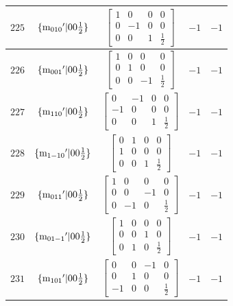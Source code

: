 \documentclass[fleqn,8pt]{jsarticle}
\begin{document}
\begin{longtable}{ccccc}
$ 225 $ & $ \{{\rm m}_{010}{}'|0 0 \frac{1}{2}\} $ & $ \begin{bmatrix} 1 & 0 & 0 & 0 \\ 0 & -1 & 0 & 0 \\ 0 & 0 & 1 & \frac{1}{2} \end{bmatrix} $ & $ -1 $ & $ -1 $ \\ \hline
$ 226 $ & $ \{{\rm m}_{001}{}'|0 0 \frac{1}{2}\} $ & $ \begin{bmatrix} 1 & 0 & 0 & 0 \\ 0 & 1 & 0 & 0 \\ 0 & 0 & -1 & \frac{1}{2} \end{bmatrix} $ & $ -1 $ & $ -1 $ \\ \hline
$ 227 $ & $ \{{\rm m}_{110}{}'|0 0 \frac{1}{2}\} $ & $ \begin{bmatrix} 0 & -1 & 0 & 0 \\ -1 & 0 & 0 & 0 \\ 0 & 0 & 1 & \frac{1}{2} \end{bmatrix} $ & $ -1 $ & $ -1 $ \\ \hline
$ 228 $ & $ \{{\rm m}_{1-10}{}'|0 0 \frac{1}{2}\} $ & $ \begin{bmatrix} 0 & 1 & 0 & 0 \\ 1 & 0 & 0 & 0 \\ 0 & 0 & 1 & \frac{1}{2} \end{bmatrix} $ & $ -1 $ & $ -1 $ \\ \hline
$ 229 $ & $ \{{\rm m}_{011}{}'|0 0 \frac{1}{2}\} $ & $ \begin{bmatrix} 1 & 0 & 0 & 0 \\ 0 & 0 & -1 & 0 \\ 0 & -1 & 0 & \frac{1}{2} \end{bmatrix} $ & $ -1 $ & $ -1 $ \\ \hline
$ 230 $ & $ \{{\rm m}_{01-1}{}'|0 0 \frac{1}{2}\} $ & $ \begin{bmatrix} 1 & 0 & 0 & 0 \\ 0 & 0 & 1 & 0 \\ 0 & 1 & 0 & \frac{1}{2} \end{bmatrix} $ & $ -1 $ & $ -1 $ \\ \hline
$ 231 $ & $ \{{\rm m}_{101}{}'|0 0 \frac{1}{2}\} $ & $ \begin{bmatrix} 0 & 0 & -1 & 0 \\ 0 & 1 & 0 & 0 \\ -1 & 0 & 0 & \frac{1}{2} \end{bmatrix} $ & $ -1 $ & $ -1 $ \\ \hline

\end{longtable}
\end{document}

